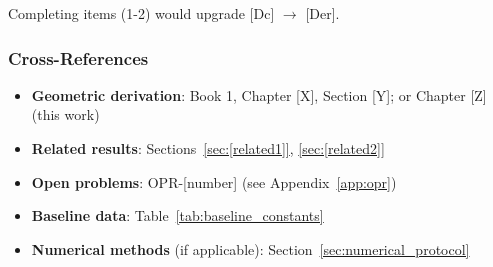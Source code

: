 Completing items (1-2) would upgrade [Dc] $\to$ [Der].


\subsubsection{Cross-References}

\begin{itemize}
\item \textbf{Geometric derivation}: Book 1, Chapter [X], Section [Y]; or Chapter [Z] (this work)
\item \textbf{Related results}: Sections~\ref{sec:[related1]}, \ref{sec:[related2]}
\item \textbf{Open problems}: OPR-[number] (see Appendix~\ref{app:opr})
\item \textbf{Baseline data}: Table~\ref{tab:baseline_constants}
\item \textbf{Numerical methods} (if applicable): Section~\ref{sec:numerical_protocol}
\end{itemize}


% 
% 
% 
% 
% 
% 
% 
% 


